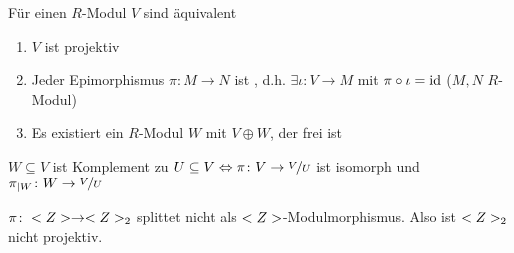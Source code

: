 \begin{proposition}
	Für einen $R$-Modul $V$ sind äquivalent
	\begin{enumerate}
		\item $V$ ist projektiv
		\item Jeder Epimorphismus $\pi\colon M \to N$ ist , d.h. $\exists \iota \colon V \to M$ mit $\pi \circ \iota = \operatorname{id}$ ($M,N$ $R$-Modul)
		\item Es existiert ein $R$-Modul $W$ mit $V \oplus W$, der frei ist
	\end{enumerate}
\end{proposition}
\begin{remark}
	$W \subseteq V$ ist Komplement zu $U \subseteq V \Leftrightarrow \pi \colon V \to \lnkset{V}{U}$ ist isomorph und $\pi_{\mid W}\colon W \to \lnkset{V}{U}$
\end{remark}
\begin{example}
	$\pi \colon <Z> \to <Z>_2$ splittet nicht als $<Z>$-Modulmorphismus. Also ist $<Z>_2$ nicht projektiv.
\end{example}
